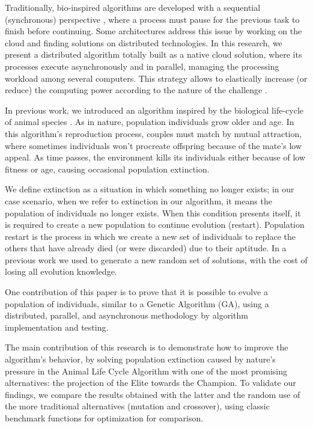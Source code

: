 \documentclass[graybox]{svmult}
\begin{document}
    Traditionally, bio-inspired algorithms are developed with a sequential
    (synchronous) perspective
    \cite{porto2018evolutionary,back1996evolutionary}, where a process must
    pause for the previous task to finish before continuing. 
    Some architectures address this issue \cite{valdez2021container,garcia2015evospace,merelo2016nodio} 
    by working on the cloud and finding solutions on distributed technologies.
    In this research, we present a distributed algorithm totally built as a 
    native cloud solution, where its processes execute asynchronously and in 
    parallel, managing the processing workload among several computers.  
    This strategy allows to elastically increase (or reduce) the
    computing power according to the nature of the challenge
    \cite{armbrust2010view}.

    In previous work, we introduced an algorithm inspired by the biological
    life-cycle of animal species \cite{Felix-Saul2022}. As in nature, population individuals grow older
    and age. In this algorithm's reproduction process, couples must match by mutual
    attraction, where sometimes individuals won't procreate offspring because of
    the mate's low appeal. As time passes, the environment kills its individuals
    either because of low fitness or age, causing occasional population extinction.
    
    We define extinction as a situation in which something no longer exists; in
    our case scenario, when we refer to extinction in our algorithm, it means
    the population of individuals no longer exists. When this condition
    presents itself, it is required to create a new population to continue
    evolution (restart). Population restart is the process in which we create a
    new set of individuals to replace the others that have already died (or
    were discarded) due to their aptitude. In a previous work
    \cite{Felix-Saul2022} we used to generate a new random set of solutions,
    with the cost of losing all evolution knowledge.
    
    One contribution of this paper is to prove that it is possible to
    evolve a population of individuals, similar to a Genetic Algorithm (GA),
    using a distributed, parallel, and asynchronous methodology by algorithm
    implementation and testing.

    The main contribution of this research is to demonstrate how to improve the
    algorithm's behavior, by solving population extinction caused by nature's
    pressure in the Animal Life Cycle Algorithm with one of the most promising
    alternatives: the projection of the Elite towards the Champion. To validate
    our findings, we compare the results obtained with the latter and the
    random use of the more traditional alternatives (mutation and crossover),
    using classic benchmark functions for optimization for comparison.
\end{document}
